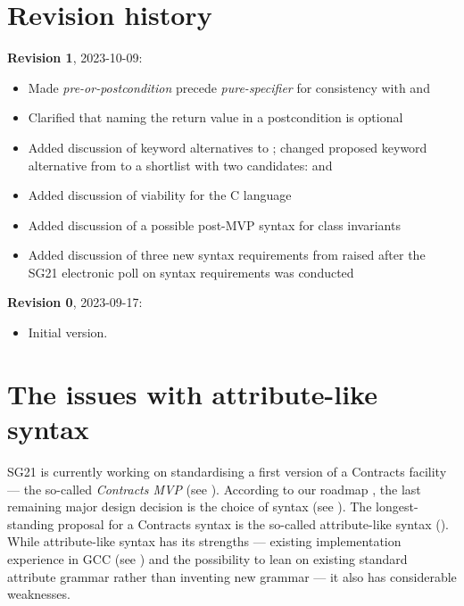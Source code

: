 \section*{Revision history}
\textbf{Revision 1}, 2023-10-09: 
\begin{itemize}
\item Made \emph{pre-or-postcondition} precede \emph{pure-specifier} for consistency with  and 
\item Clarified that naming the return value in a postcondition is optional
\item Added discussion of keyword alternatives to ; changed proposed keyword alternative from  to a shortlist with two candidates:  and 
\item Added discussion of viability for the C language
\item Added discussion of a possible post-MVP syntax for class invariants
\item Added discussion of three new syntax requirements from \cite{P2885R3} raised after the SG21 electronic poll on syntax requirements was conducted
\end{itemize}
\textbf{Revision 0}, 2023-09-17: 
\begin{itemize}
\item Initial version.
\end{itemize}



\section{The issues with attribute-like syntax}
\label{sec:motivation}

SG21 is currently working on standardising a first version of a Contracts facility --- the so-called \emph{Contracts MVP} (see \cite{P2900R0}). According to our roadmap \cite{P2695R1}, the last remaining major design decision is the choice of syntax (see \cite{P2885R3}). The longest-standing proposal for a Contracts syntax is the so-called attribute-like syntax (\cite{P2935R3}). While attribute-like syntax has its strengths --- existing implementation experience in GCC (see \cite{P1680R0}) and the possibility to lean on existing standard attribute grammar rather than inventing new grammar --- it also has considerable weaknesses.

